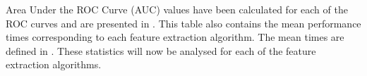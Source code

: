 
Area Under the ROC Curve (AUC) values have been calculated for each of the ROC curves and are presented in . This table also contains the mean performance times corresponding to each feature extraction algorithm. The mean times are defined in . These statistics will now be analysed for each of the feature extraction algorithms.\\


